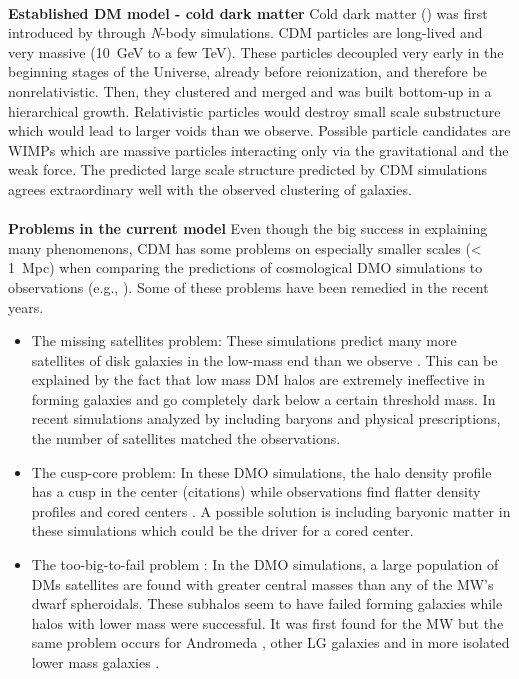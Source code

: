 \\\textbf{Established \ac{DM} model - cold dark matter}
Cold dark matter () was first introduced by \cite{Davis....CDM...1985} through \textit{N}-body simulations. \ac{CDM} particles are long-lived and very massive (\SI{10}{GeV} to a few TeV). These particles decoupled very early in the beginning stages of the Universe, already before reionization, and therefore be nonrelativistic. Then, they clustered and merged and was built bottom-up in a hierarchical growth.  Relativistic particles would destroy small scale substructure which would lead to larger voids than we observe. Possible particle candidates are \ac{WIMPs} which are massive particles interacting only via the gravitational and the weak force. The predicted large scale structure predicted by \ac{CDM} simulations agrees extraordinary well with the observed clustering of galaxies. \\
\\\textbf{Problems in the current model}
Even though the big success in explaining many phenomenons, \ac{CDM} has some problems on especially smaller scales (< \SI{1}{Mpc}) when comparing the predictions of cosmological \ac{DMO} simulations to observations (e.g., \cite{Bullock...LCDMprobs...2017}). Some of these problems have been remedied in the recent years.
\begin{itemize}
    \item The missing satellites problem: These simulations predict many more satellites of disk galaxies in the low-mass end than we observe \citep{Klypin...missingsatellites...1999, Moore...missingsatellites..1999}. This can be explained by the fact that low mass \ac{DM} halos are extremely ineffective in forming galaxies and go completely dark below a certain threshold mass. In recent simulations analyzed by \citet{Sawala...noCDMproblems...2016} including baryons and physical prescriptions, the number of satellites matched the observations.
    \item The cusp-core problem: In these \ac{DMO} simulations, the halo density profile has a cusp in the center (citations) while observations find flatter density profiles and cored centers \citep{Flores...cuspcoreprob...1994, Moore...cuspcoreprob...1994}. A possible solution is including baryonic matter in these simulations which could be the driver for a cored center. 
    \item The too-big-to-fail problem \citep{Boylan...toobigtoofail...2011}: In the \ac{DMO} simulations, a large population of \acp{DM} satellites are found with greater central masses than any of the \ac{MW}'s dwarf spheroidals. These subhalos seem to have failed forming galaxies while halos with lower mass were successful. It was first found for the \ac{MW} but the same problem occurs for Andromeda \citep{Tollerud...M31tbtf...2014}, other \ac{LG} galaxies \citep{Kirby...LGtbtf...2014} and in more isolated lower mass galaxies \citep{Ferrero...DGtbtf...2012, Papastergis...DGtbtf...2015, Papastergis...DGtbtf...2016}.
    \iffalse\item The planes of satellites problem: \fi
\end{itemize}

